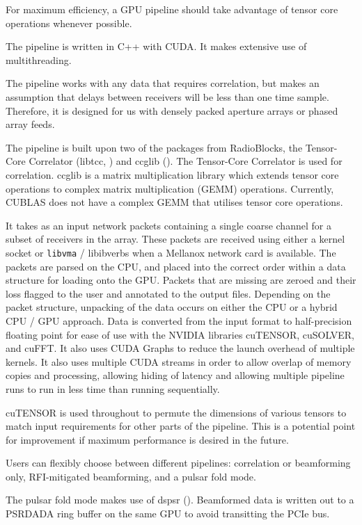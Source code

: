 \documentclass{pas}
\begin{document}
For maximum efficiency, a GPU pipeline should take advantage of tensor core operations
whenever possible. 

The pipeline is written in C++ with CUDA. It makes extensive use of
multithreading.

The pipeline works with any data that requires correlation, but makes an
assumption that delays between receivers will be less than one time sample.
Therefore, it is designed for us with densely packed aperture arrays or phased
array feeds.

The pipeline is built upon two of the packages from RadioBlocks, the
Tensor-Core Correlator (libtcc, \cite{romein_tensor-core_2021}) and ccglib
(\cite{oostrum_tensor-core_2025}). The Tensor-Core Correlator is used for
correlation. ccglib is a matrix multiplication library which extends tensor
core operations to complex matrix multiplication (GEMM) operations. Currently,
CUBLAS does not have a complex GEMM that utilises tensor core operations.

It takes as an input network packets containing a single coarse
channel for a subset of receivers in the array. These packets are
received using either a kernel socket or \texttt{libvma} / libibverbs when a
Mellanox network card is available. The packets are parsed on the CPU,
and placed into the correct order within a data structure for loading
onto the GPU. Packets that are missing are zeroed and their loss
flagged to the user and annotated to the output files. Depending on
the packet structure, unpacking of the data occurs on either the CPU
or a hybrid CPU / GPU approach. Data is converted from the input
format to half-precision floating point for ease of use with the
NVIDIA libraries cuTENSOR, cuSOLVER, and cuFFT. It also uses CUDA
Graphs to reduce the launch overhead of multiple kernels. It also uses
multiple CUDA streams in order to allow overlap of memory copies and
processing, allowing hiding of latency and allowing multiple pipeline
runs to run in less time than running sequentially.

cuTENSOR is used throughout to permute the dimensions of various tensors to 
match input requirements for other parts of the pipeline. This is a potential 
point for improvement if maximum performance is desired in the future.

Users can flexibly choose between different pipelines: correlation or
beamforming only, RFI-mitigated beamforming, and a pulsar fold mode.

The pulsar fold mode makes use of dspsr (\cite{van_straten_dspsr_2011}).
Beamformed data is written out to a PSRDADA ring buffer on the same GPU to avoid 
transitting the PCIe bus. 
\end{document}
